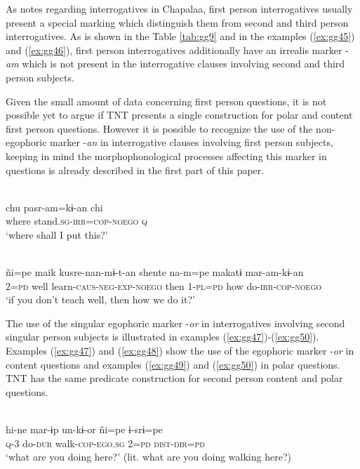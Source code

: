 \documentclass[output=paper]{langsci/langscibook}
\begin{document}
As \citet[13--14]{Floyd2018} notes regarding interrogatives in Chapalaa, first person interrogatives usually present a special marking which distinguish them from second and third person interrogatives. As is shown in the Table \ref{tab:gg9} and in the examples (\ref{ex:gg45}) and (\ref{ex:gg46}), first person interrogatives additionally have an irrealis marker -\textit{am} which is not present in the interrogative clauses involving second and third person subjects. 

Given the small amount of data concerning first person questions, it is not possible yet to argue if TNT presents a single construction for polar and content first person questions. However it is possible to recognize the use of the non-egophoric marker -\textit{an} in interrogative clauses involving first person subjects, keeping in mind the morphophonological processes affecting this marker in questions is already described in the first part of this paper.


\ea \label{ex:gg45}
\\
    \gll chu	 pasr-am=kɨ-an	chi\\
         where	stand.\textsc{sg-irr=cop-noego}	\textsc{q}\\
    \glt ‘where shall I put this?'
\z



\ea \label{ex:gg46}
\\
    \gll ñi=pe maik kusre-nan-mɨ-t-an shente na-m=pe makatɨ	mar-am-kɨ-an\\
         2=\textsc{pd} well learn-\textsc{caus-neg-exp-noego} then 1-\textsc{pl=pd}	how	do-\textsc{irr-cop-noego}\\
    \glt ‘if you don’t teach well, then how we do it?'
\z

The use of the singular egophoric marker -\textit{or} in interrogatives involving second singular person subjects is illustrated in examples (\ref{ex:gg47})-(\ref{ex:gg50}).
Examples (\ref{ex:gg47}) and (\ref{ex:gg48}) show the use of the egophoric marker -\textit{or} in content questions and examples (\ref{ex:gg49}) and (\ref{ex:gg50}) in polar questions. TNT has the same predicate construction for second person content and polar questions.



\ea \label{ex:gg47}
\\
    \gll hi-ne	mar-ɨp	un-kɨ-or	ñi=pe	ɨ-srɨ=pe\\
         \textsc{q}-3	do-\textsc{dur}	walk-\textsc{cop-ego.sg} 2=\textsc{pd}	\textsc{dist-dir=pd}\\
    \glt ‘what are you doing here?' (lit. what are you doing walking here?)
\z
\end{document}

